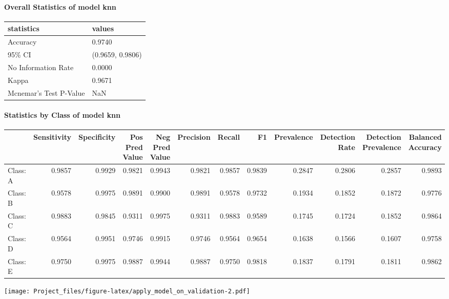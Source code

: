 \documentclass[]{article}
\let\oldparagraph\paragraph
\renewcommand{\paragraph}[1]{\oldparagraph{#1}\mbox{}}
\begin{document}
\paragraph{Overall Statistics of model
knn}\label{overall-statistics-of-model-knn}

\begin{table}[H]
\centering
\begin{tabular}{l|l}
\hline
statistics & values\\
\hline
Accuracy & 0.9740\\
\hline
95\% CI & (0.9659, 0.9806)\\
\hline
No Information Rate & 0.0000\\
\hline
Kappa & 0.9671\\
\hline
Mcnemar's Test P-Value & NaN\\
\hline
\end{tabular}
\end{table}

\paragraph{Statistics by Class of model
knn}\label{statistics-by-class-of-model-knn}

\begingroup\fontsize{11}{13}\selectfont

\begin{tabular}{l|r|r|r|r|r|r|r|r|r|r|r}
\hline
  & Sensitivity & Specificity & Pos Pred Value & Neg Pred Value & Precision & Recall & F1 & Prevalence & Detection Rate & Detection Prevalence & Balanced Accuracy\\
\hline
Class: A & 0.9857 & 0.9929 & 0.9821 & 0.9943 & 0.9821 & 0.9857 & 0.9839 & 0.2847 & 0.2806 & 0.2857 & 0.9893\\
\hline
Class: B & 0.9578 & 0.9975 & 0.9891 & 0.9900 & 0.9891 & 0.9578 & 0.9732 & 0.1934 & 0.1852 & 0.1872 & 0.9776\\
\hline
Class: C & 0.9883 & 0.9845 & 0.9311 & 0.9975 & 0.9311 & 0.9883 & 0.9589 & 0.1745 & 0.1724 & 0.1852 & 0.9864\\
\hline
Class: D & 0.9564 & 0.9951 & 0.9746 & 0.9915 & 0.9746 & 0.9564 & 0.9654 & 0.1638 & 0.1566 & 0.1607 & 0.9758\\
\hline
Class: E & 0.9750 & 0.9975 & 0.9887 & 0.9944 & 0.9887 & 0.9750 & 0.9818 & 0.1837 & 0.1791 & 0.1811 & 0.9862\\
\hline
\end{tabular}

\endgroup{}

\texttt{[image: Project\_files/figure-latex/apply\_model\_on\_validation-2.pdf]}
\end{document}
